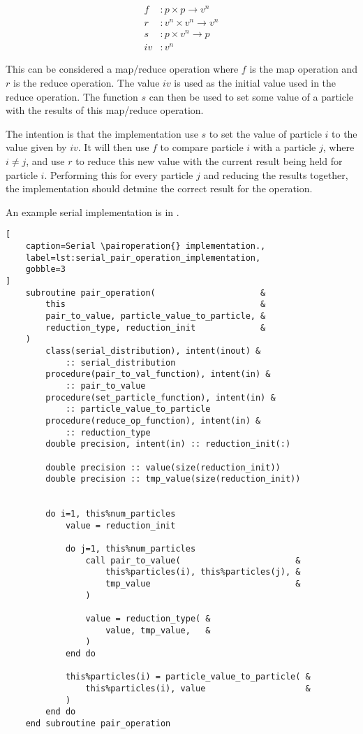 \begin{equation}
    \begin{split}
        f &: p\times{}p \rightarrow{} v^n \\
        r &: v^n\times{}v^n \rightarrow{} v^n \\
        s &: p\times{}v^n \rightarrow{} p \\
        iv &: v^n
    \end{split}
\end{equation}

This can be considered a map/reduce operation where $f$ is the map operation
and $r$ is the reduce operation.
%
The value $iv$ is used as the initial value used in the reduce operation.
%
The function $s$ can then be used to set some value of a particle with
the results of this map/reduce operation.

The intention is that the implementation use $s$ to set the value
of particle $i$ to the value given by $iv$.
%
It will then use $f$ to compare particle
$i$ with a particle $j$, where $i \ne{} j$, and use $r$ to
reduce this new value with the current result being held for
particle $i$.
%
Performing this for every particle $j$ and reducing the results together,
the implementation should detmine the correct result for the operation.

An example serial implementation is in
.

\begin{lstlisting}[
    caption=Serial \pairoperation{} implementation.,
    label=lst:serial_pair_operation_implementation,
    gobble=3
]
    subroutine pair_operation(                     &
        this                                       &
        pair_to_value, particle_value_to_particle, &
        reduction_type, reduction_init             &
    )
        class(serial_distribution), intent(inout) &
            :: serial_distribution
        procedure(pair_to_val_function), intent(in) &
            :: pair_to_value
        procedure(set_particle_function), intent(in) &
            :: particle_value_to_particle
        procedure(reduce_op_function), intent(in) &
            :: reduction_type
        double precision, intent(in) :: reduction_init(:)

        double precision :: value(size(reduction_init))
        double precision :: tmp_value(size(reduction_init))


        do i=1, this%num_particles
            value = reduction_init

            do j=1, this%num_particles
                call pair_to_value(                       &
                    this%particles(i), this%particles(j), &
                    tmp_value                             &
                )

                value = reduction_type( &
                    value, tmp_value,   &
                )
            end do

            this%particles(i) = particle_value_to_particle( &
                this%particles(i), value                    &
            )
        end do
    end subroutine pair_operation
\end{lstlisting}

